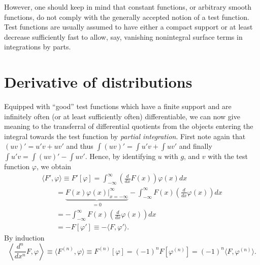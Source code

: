 However, one should keep in mind that constant functions, or arbitrary smooth functions, do not comply with the generally accepted notion of a test function.
Test functions are usually assumed to have either a compact support or at least decrease sufficiently fast to allow,
say,  vanishing nonintegral surface terms in integrations by parts.

\section{Derivative of distributions}

Equipped with ``good'' test functions
which have a finite support and are
infinitely often (or at least sufficiently often) differentiable,
we can now give meaning to the transferral  of differential quotients from
the objects entering the integral towards the test function by {\em partial integration}.
First note again that $(uv)' = u'v+uv'$
and thus
$\int (uv)' = \int u'v+\int uv'$
and finally   $\int u'v = \int (uv)'  -\int uv'$.
Hence,     by identifying $u$ with $g$, and $v$ with the test function $\varphi$, we obtain
\begin{equation}
\begin{split}
\langle {F}' , \varphi \rangle \equiv {F}'\left[\varphi\right] =
\int_{-\infty}^\infty
\left( \frac{d}{dx} F(x)\right) \varphi (x) dx
\\
\qquad =
\underbrace{\left. F(x) \varphi (x) \right|_{x=-\infty}^\infty}_{=0}
- \int_{-\infty}^\infty
F(x)\left( \frac{d}{dx} \varphi (x) \right) dx \\
\qquad =
- \int_{-\infty}^\infty
F(x)\left( \frac{d}{dx} \varphi (x) \right) dx \\
\qquad =-F\left[\varphi  '\right] \equiv - \langle {F} , \varphi '\rangle .
\end{split}
\end{equation}
By induction
\begin{equation}
\left\langle \frac{d^{n}}{dx^{n}}{F} , \varphi \right\rangle
\equiv
\langle {F}^{(n)} , \varphi \rangle \equiv F^{(n)}\left[\varphi\right]
 = (-1)^n F\left[\varphi  ^{(n)}\right]
 = (-1)^n   \langle {F} , \varphi^{(n)}\rangle.
\end{equation}



